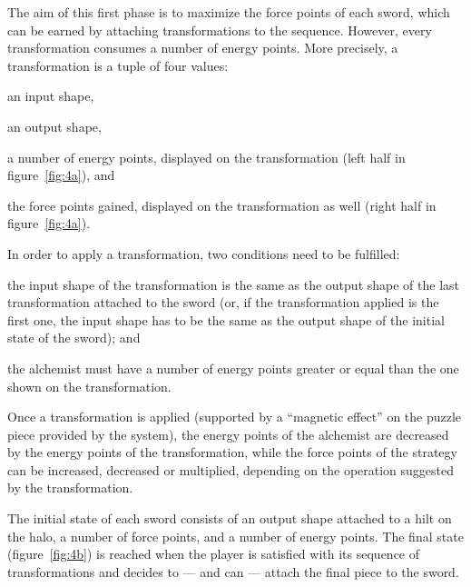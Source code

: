 The aim of this first phase is to maximize the force points of each sword, which can be earned by attaching transformations to the sequence. However, every transformation consumes a number of energy points. More precisely, a transformation is a tuple of four values:
\begin{enumerate*}[label=(\arabic*)]
  \item an input shape,
  \item an output shape,
  \item a number of energy points, displayed on the transformation (left half in figure~\ref{fig:4a}), and
  \item the force points gained, displayed on the transformation as well (right half in figure~\ref{fig:4a}).
\end{enumerate*}

In order to apply a transformation, two conditions need to be fulfilled:
\begin{enumerate*}[label=(\arabic*)]
  \item the input shape of the transformation is the same as the output shape of the last transformation attached to the sword (or, if the transformation applied is the first one, the input shape has to be the same as the output shape of the initial state of the sword); and
  \item the alchemist must have a number of energy points greater or equal than the one shown on the transformation.
\end{enumerate*}

Once a transformation is applied (supported by a ``magnetic effect'' on the puzzle piece provided by the system), the energy points of the alchemist are decreased by the energy points of the transformation, while the force points of the strategy can be increased, decreased or multiplied, depending on the operation suggested by the transformation.

The initial state of each sword consists of an output shape attached to a hilt on the halo, a number of force points, and a number of energy points. The final state (figure~\ref{fig:4b}) is reached when the player is satisfied with its sequence of transformations and decides to --- and can --- attach the final piece to the sword. 


